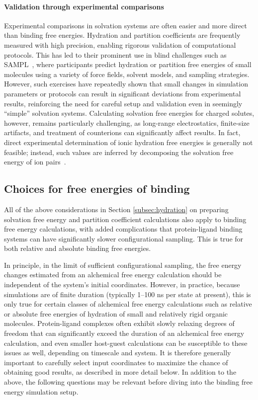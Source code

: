 \documentclass[9pt,bestpractices]{livecoms}
\begin{document}
\paragraph{Validation through experimental comparisons}  
Experimental comparisons in solvation systems are often easier and more direct than binding free energies. Hydration and partition coefficients are frequently measured with high precision, enabling rigorous validation of computational protocols. This has led to their prominent use in blind challenges such as SAMPL~\cite{skillman2012sampl3, mobley2014sampl4, bergazin2021sampl7}, where participants predict hydration or partition free energies of small molecules using a variety of force fields, solvent models, and sampling strategies. However, such exercises have repeatedly shown that small changes in simulation parameters or protocols can result in significant deviations from experimental results, reinforcing the need for careful setup and validation even in seemingly ``simple'' solvation systems.  Calculating solvation free energies for charged solutes, however, remains particularly challenging, as long-range electrostatics, finite-size artifacts, and treatment of counterions can significantly affect results. In fact, direct experimental determination of ionic hydration free energies is generally not feasible; instead, such values are inferred by decomposing the solvation free energy of ion pairs~\cite{mobley2014freesolv}. 

\subsection{Choices for free energies of binding}
\label{subsec:binding}
All of the above considerations in Section \ref{subsec:hydration} on preparing solvation free energy and partition coefficient calculations also apply to binding free energy calculations, with added complications that protein-ligand binding systems can have significantly slower configurational sampling.  This is true for both relative and absolute binding free energies.

In principle, in the limit of sufficient configurational sampling, the free energy changes estimated from an alchemical free energy calculation should be independent of the system's initial coordinates. However, in practice, because simulations are of finite duration (typically 1--100 ns per state at present), this is only true for certain classes of alchemical free energy calculations such as relative or absolute free energies of hydration of small and relatively rigid organic molecules. Protein-ligand complexes often exhibit slowly relaxing degrees of freedom that can significantly exceed the duration of an alchemical free energy calculation, and even smaller host-guest calculations can be susceptible to these issues as well, depending on timescale and system. It is therefore generally important to carefully select input coordinates to maximize the chance of obtaining good results, as described in more detail below.  
In addition to the above, the following questions may be relevant before diving into the binding free energy simulation setup.
\end{document}
